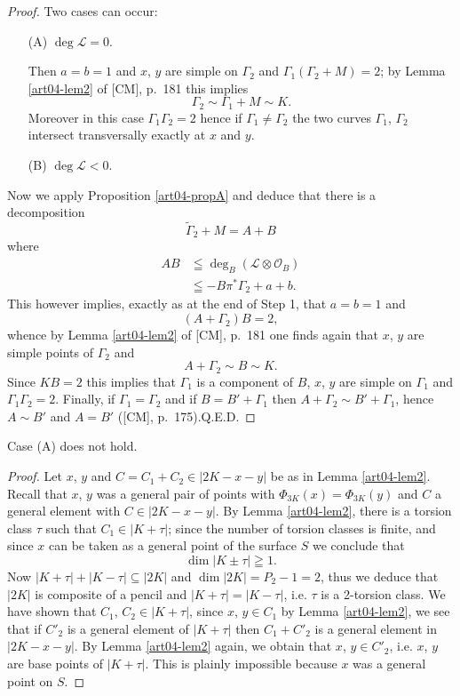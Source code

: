 \begin{proof}
Two cases can occur:
\begin{itemize}
\item[(A)] $\deg\mathscr{L}=0$.

Then $a=b=1$ and $x$, $y$ are simple on $\Gamma_{2}$ and
$\Gamma_{1}(\Gamma_{2}+M)=2$; by Lemma \ref{art04-lem2} of [CM], p.~181 this implies
$$
\Gamma_{2}\sim \Gamma_{1}+M\sim K.
$$
Moreover in this case $\Gamma_{1}\Gamma_{2}=2$ hence if
$\Gamma_{1}\neq \Gamma_{2}$ the two curves $\Gamma_{1}$, $\Gamma_{2}$
intersect transversally exactly at $x$ and $y$.

\item[(B)] $\deg \mathscr{L}<0$.
\end{itemize}
Now we apply Proposition \ref{art04-propA} and deduce that there is a
decomposition 
$$
\widetilde{\Gamma}_{2}+M=A+B
$$\pageoriginale
where 
\begin{align*}
AB & \leqq \deg_{B}(\mathscr{L}\otimes \mathscr{O}_{B})\\
& \leqq -B\pi^{*}\Gamma_{2}+a+b.
\end{align*}
This however implies, exactly as at the end of Step 1, that $a=b=1$
and
$$
(A+\Gamma_{2})B=2,
$$
whence by Lemma \ref{art04-lem2} of [CM], p.~181 one finds again that
$x$, $y$ are simple points of $\Gamma_{2}$ and
$$
A+\Gamma_{2}\sim B\sim K.
$$
Since $KB=2$ this implies that $\Gamma_{1}$ is a component of $B$,
$x$, $y$ are simple on $\Gamma_{1}$ and
$\Gamma_{1}\Gamma_{2}=2$. Finally, if $\Gamma_{1}=\Gamma_{2}$ and if
$B=B'+\Gamma_{1}$ then $A+\Gamma_{2}\sim B'+\Gamma_{1}$, hence $A\sim
B'$ and $A=B'$ ([CM], p.~175).\hfill Q.E.D.
\end{proof}

\begin{lem}\label{art04-lem3}
Case {\rm (A)} does not hold.
\end{lem}

\begin{proof}
Let $x$, $y$ and $C=C_{1}+C_{2}\in |2K-x-y|$ be as in
Lemma \ref{art04-lem2}. Recall that $x$, $y$ was a general pair of
points with $\Phi_{3K}(x)=\Phi_{3K}(y)$ and $C$ a general element with
$C\in |2K-x-y|$. By Lemma \ref{art04-lem2}, there is a torsion class
$\tau$ such that $C_{1}\in |K+\tau|$; since the number of torsion
classes is finite, and since $x$ can be taken as a general point of
the surface $S$ we conclude that
$$
\dim |K\pm \tau|\geqq 1.
$$
Now $|K+\tau|+|K-\tau|\subseteq |2K|$ and $\dim |2K|=P_{2}-1=2$, thus
we deduce that $|2K|$ is composite of a pencil and
$|K+\tau|=|K-\tau|$, i.e. $\tau$ is a 2-torsion class. We have shown
that $C_{1}$, $C_{2}\in |K+\tau|$, since $x$, $y\in C_{1}$ by
Lemma \ref{art04-lem2}, we see that if $C'_{2}$ is a general element
of $|K+\tau|$ then $C_{1}+C'_{2}$ is a general element in
$|2K-x-y|$. By Lemma \ref{art04-lem2} again, we obtain that $x$, $y\in
C'_{2}$, i.e. $x$, $y$ are base points of $|K+\tau|$. This is plainly
impossible because $x$ was a general point on $S$.
\end{proof}

